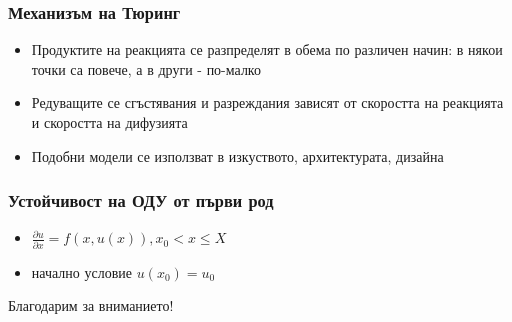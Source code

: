 \documentclass[14pt]{beamer}
\begin{document}
\begin{frame}
\frametitle{Механизъм на Тюринг}
\begin{itemize}
  \item Продуктите на реакцията се разпределят в обема по различен начин: в някои точки са повече, а в други - по-малко
  \item Редуващите се сгъстявания и разреждания зависят от скоростта на реакцията и скоростта на дифузията
  \item Подобни модели се използват в изкуството, архитектурата, дизайна
\end{itemize}
\end{frame}

\begin{frame}
\frametitle{Устойчивост на ОДУ от първи род}
\begin{itemize}
\item $\frac{\partial u}{\partial x} = f(x,u(x)), x_0 < x \leq X$
\item начално условие $u(x_0) = u_0$
\end{itemize}
\end{frame}


\begin{frame}
\begin{center}
Благодарим за вниманието!
\end{center}
\end{frame}
\end{document}
